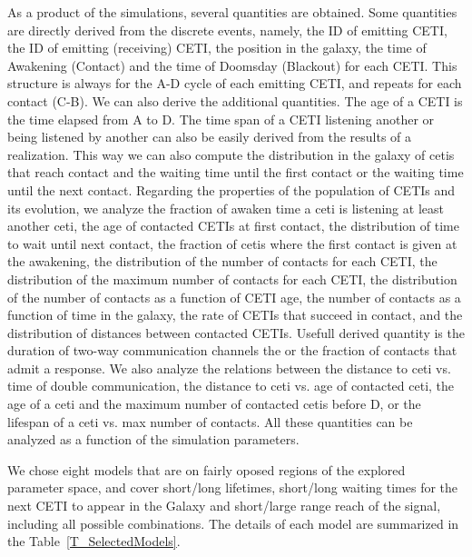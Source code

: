\documentclass[crop]{CSLB}%
\begin{document}
As a product of the simulations, several quantities are obtained.
%
Some quantities are directly derived from the discrete events, namely,
the ID of emitting CETI, the ID of emitting (receiving) CETI, the
position in the galaxy, the time of Awakening (Contact) and the time
of Doomsday  (Blackout) for each CETI.
%
This structure is always for the A-D cycle of each emitting CETI, and
repeats for each contact (C-B).
%
We can also derive the additional quantities.
%
The age of a CETI is the time elapsed from A to D.
%
%
%
The time span of a CETI listening another or being listened by another
can also be easily derived from the results of a realization.
%
This way we can also compute the distribution in the galaxy of cetis
that reach contact and the waiting time until the first contact or the
waiting time until the next contact.
%
Regarding the properties of the population of CETIs and its evolution,
we analyze the fraction of awaken time a ceti is listening at least
another ceti, the age of contacted CETIs at first contact, the
distribution of time to wait until next contact, the fraction of cetis
where the first contact is given at the awakening, the distribution of
the number of contacts for each CETI, the distribution of the maximum
number of contacts for each CETI, the distribution of the number of
contacts as a function of CETI age, the number of contacts as a
function of time in the galaxy, the rate of CETIs that succeed in
contact, and the distribution of distances between contacted CETIs.
%
Usefull derived quantity is the duration of two-way communication
channels the or the fraction of contacts that admit a response.
% 
We also analyze the relations between the distance to ceti vs. time of
double communication, the distance to ceti vs. age of contacted ceti,
the age of a ceti and the maximum number of contacted cetis before D,
or the lifespan of a ceti vs. max number of contacts.
%
All these quantities can be analyzed as a function of the simulation
parameters.
%



We chose eight models that are on fairly oposed regions of the
explored parameter space, and cover short/long lifetimes, short/long
waiting times for the next CETI to appear in the Galaxy and
short/large range reach of the signal, including all possible
combinations.
%
The details of each model are summarized in the
Table~\ref{T_SelectedModels}.
\end{document}
